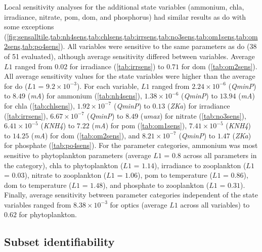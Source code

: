 \documentclass[letterpaper,12pt,oneside]{article}\usepackage[]{graphicx}\usepackage[]{color}
\begin{document}
Local sensitivity analyses for the additional state variables (ammonium, \ac{chla}, irradiance, nitrate, \ac{pom}, \ac{dom}, and phosphorus) had similar results as \ac{do} with some exceptions (\cref{fig:sensalltile,tab:nh4sens,tab:chlsens,tab:irrsens,tab:no3sens,tab:om1sens,tab:om2sens,tab:po4sens}).  All variables were sensitive to the same parameters as \ac{do} (38 of 51 evaluated), although average sensitivity differed between variables.  Average $L1$ ranged from $0.02$ for irradiance (\cref{tab:irrsens}) to $0.71$ for \ac{dom} (\cref{tab:om2sens}).  All average sensitivity values for the state variables were higher than the average for \ac{do} ($L1$ = $9.2\times 10^{-3}$).  For each variable, $L1$ ranged from $2.24\times 10^{-6}$ (\textit{QminP}) to $8.49$ (\textit{mA}) for ammonium (\cref{tab:nh4sens}), $1.38\times 10^{-6}$ (\textit{QminP}) to $13.94$ (\textit{mA}) for \ac{chla} (\cref{tab:chlsens}), $1.92\times 10^{-7}$ (\textit{QminP}) to $0.13$ (\textit{ZKa}) for irradiance (\cref{tab:irrsens}), $6.67\times 10^{-7}$ (\textit{QminP}) to $8.49$ (\textit{umax}) for nitrate (\cref{tab:no3sens}), $6.41\times 10^{-5}$ (\textit{KNH4}) to $7.22$ (\textit{mA}) for \ac{pom} (\cref{tab:om1sens}),  $7.41\times 10^{-5}$ (\textit{KNH4}) to $14.25$ (\textit{mA}) for \ac{dom} (\cref{tab:om2sens}), and $8.21\times 10^{-7}$ (\textit{QminP}) to $1.47$ (\textit{ZKa}) for phosphate (\cref{tab:po4sens}).  For the parameter categories, ammonium was most sensitive to phytoplankton parameters (average $L1$ = $0.8$ across all parameters in the category), \ac{chla} to phytoplankton ($L1$ = $1.14$), irradiance to zooplankton ($L1$ = $0.03$), nitrate to zooplankton ($L1$ = $1.06$), \ac{pom} to temperature ($L1$ = $0.86$), \ac{dom} to temperature ($L1$ = $1.48$), and phosphate to zooplankton ($L1$ = $0.31$).  Finally, average sensitivity between parameter categories independent of the state variables ranged from $8.38\times 10^{-3}$ for optics (average $L1$ across all variables) to $0.62$ for phytoplankton. 

\subsection{Subset identifiability}
\end{document}
